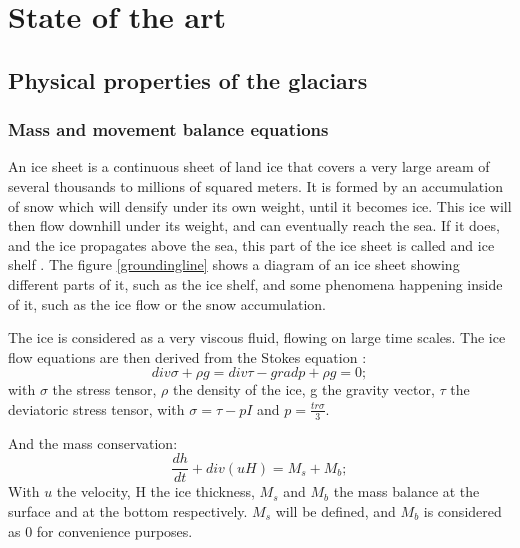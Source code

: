 \documentclass[a4paper,12pt]{article}
\begin{document}
\section{State of the art}
\subsection{Physical properties of the glaciars}
\subsubsection{Mass and movement balance equations}
An ice sheet is a continuous sheet of land ice that covers a very large aream of several thousands to millions of squared meters. It is formed by an accumulation of snow which will densify under its own weight, until it becomes ice. This ice will then flow downhill under its weight, and can eventually reach the sea. If it does, and the ice propagates above the sea, this part of the ice sheet is called and ice shelf \cite[]{hutter1982mathematical}. The figure \ref{groundingline} shows a diagram of an ice sheet showing different parts of it, such as the ice shelf, and some phenomena happening inside of it, such as the ice flow or the snow accumulation.

The ice is considered as a very viscous fluid, flowing on large time scales. The ice flow equations are then derived from the Stokes equation \cite[]{hutter1982mathematical}:
\begin{equation}
	div\sigma + \rho g = div\tau - gradp + \rho g = 0;
\end{equation}
with $\sigma$ the stress tensor, $\rho$ the density of the ice, g the gravity vector, $\tau$ the deviatoric stress tensor, with $\sigma = \tau - pI$ and $p=\frac{tr\sigma}{3}$. 

And the mass conservation:
\begin{equation}
	\frac{dh}{dt}+ div(uH)=M_s + M_b;
\end{equation}
With $u$ the velocity, H the ice thickness, $M_s$ and $M_b$ the mass balance at the surface and at the bottom respectively. $M_s$ will be defined, and $M_b$ is considered as 0 for convenience purposes. 
\end{document}
